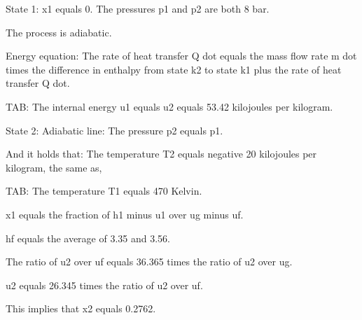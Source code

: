 State 1: x1 equals 0. The pressures p1 and p2 are both 8 bar.

The process is adiabatic.

Energy equation: The rate of heat transfer Q dot equals the mass flow rate m dot times the difference in enthalpy from state k2 to state k1 plus the rate of heat transfer Q dot.

TAB: The internal energy u1 equals u2 equals 53.42 kilojoules per kilogram.

State 2: Adiabatic line: The pressure p2 equals p1.

And it holds that: The temperature T2 equals negative 20 kilojoules per kilogram, the same as,

TAB: The temperature T1 equals 470 Kelvin.

x1 equals the fraction of h1 minus u1 over ug minus uf.

hf equals the average of 3.35 and 3.56.

The ratio of u2 over uf equals 36.365 times the ratio of u2 over ug.

u2 equals 26.345 times the ratio of u2 over uf.

This implies that x2 equals 0.2762.